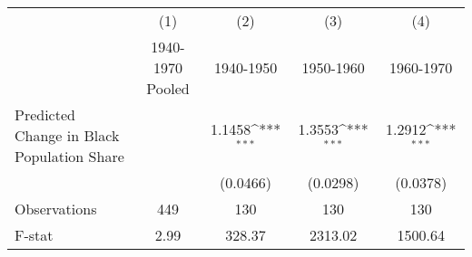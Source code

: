 {
\def\sym#1{\ifmmode^{#1}\else\(^{#1}\)\fi}
\begin{tabular}{l*{4}{c}}
\hline\hline
                    &\multicolumn{1}{c}{(1)}&\multicolumn{1}{c}{(2)}&\multicolumn{1}{c}{(3)}&\multicolumn{1}{c}{(4)}\\
                    &\multicolumn{1}{c}{1940-1970 Pooled}&\multicolumn{1}{c}{1940-1950}&\multicolumn{1}{c}{1950-1960}&\multicolumn{1}{c}{1960-1970}\\
\hline
Predicted Change in Black Population Share&                     &      1.1458\sym{***}&      1.3553\sym{***}&      1.2912\sym{***}\\
                    &                     &    (0.0466)         &    (0.0298)         &    (0.0378)         \\
\hline
Observations        &         449         &         130         &         130         &         130         \\
F-stat              &        2.99         &      328.37         &     2313.02         &     1500.64         \\
\hline\hline
\end{tabular}
}
